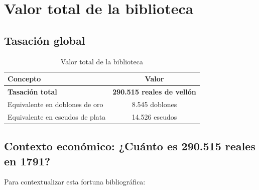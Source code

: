 \documentclass[12pt,a4paper]{article}
\begin{document}
\section{Valor total de la biblioteca}

\subsection{Tasación global}

\begin{table}[h]
\centering
\caption{Valor total de la biblioteca}
\begin{tabular}{lc}
\toprule
\textbf{Concepto} & \textbf{Valor} \\
\midrule
\textbf{Tasación total} & \textbf{290.515 reales de vellón} \\
\midrule
Equivalente en doblones de oro & 8.545 doblones \\
Equivalente en escudos de plata & 14.526 escudos \\
\bottomrule
\end{tabular}
\end{table}

\subsection{Contexto económico: ¿Cuánto es 290.515 reales en 1791?}

Para contextualizar esta fortuna bibliográfica:
\end{document}
